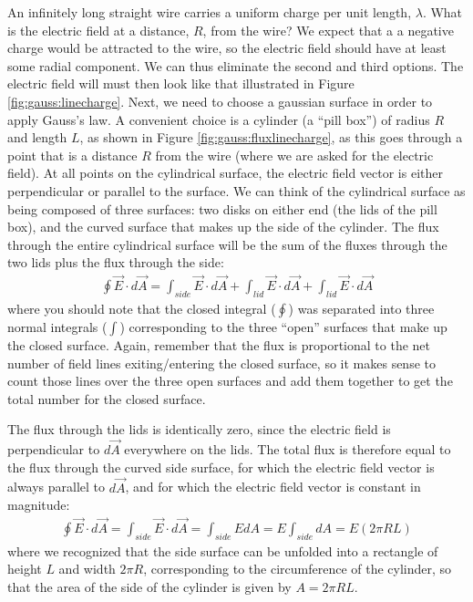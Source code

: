 \begin{example}{An infinitely long straight wire carries a uniform charge per unit length, $\lambda$. What is the electric field at a distance, $R$, from the wire?}
We expect that a a negative charge would be attracted to the wire, so the electric field should have at least some radial component. We can thus eliminate the second and third options. The electric field will must then look like that illustrated in Figure \ref{fig:gauss:linecharge}.
Next, we need to choose a gaussian surface in order to apply Gauss's law. A convenient choice is a cylinder (a ``pill box'') of radius $R$ and length $L$, as shown in Figure \ref{fig:gauss:fluxlinecharge}, as this goes through a point that is a distance $R$ from the wire (where we are asked for the electric field). At all points on the cylindrical surface, the electric field vector is either perpendicular or parallel to the surface.
We can think of the cylindrical surface as being composed of three surfaces: two disks on either end (the lids of the pill box), and the curved surface that makes up the side of the cylinder. The flux through the entire cylindrical surface will be the sum of the fluxes through the two lids plus the flux through the side:
\begin{align*}
\oint \vec E\cdot d\vec A = \int_{side} \vec E\cdot d\vec A + \int_{lid}\vec E\cdot d\vec A + \int_{lid}\vec E\cdot d\vec A
\end{align*}
where you should note that the closed integral ($\oint$) was separated into three normal integrals ($\int$) corresponding to the three ``open'' surfaces that make up the closed surface. Again, remember that the flux is proportional to the net number of field lines exiting/entering the closed surface, so it makes sense to count those lines over the three open surfaces and add them together to get the total number for the closed surface.

The flux through the lids is identically zero, since the electric field is perpendicular to $d\vec A$ everywhere on the lids. The total flux is therefore equal to the flux through the curved side surface, for which the electric field vector is always parallel to $d\vec A$, and for which the electric field vector is constant in magnitude:
\begin{align*}
\oint \vec E\cdot d\vec A = \int_{side} \vec E\cdot d\vec A =\int_{side} EdA=E\int_{side}dA=E(2\pi R L)
\end{align*}
where we recognized that the side surface can be unfolded into a rectangle of height $L$ and width $2\pi R$, corresponding to the circumference of the cylinder, so that the area of the side of the cylinder is given by $A=2\pi R L$. 


\end{example}
